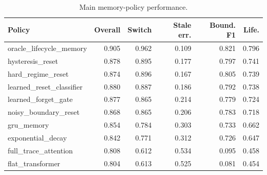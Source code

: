 \begin{table}[t]
\centering
\caption{Main memory-policy performance.}
\label{tab:main-performance}
\small
\begin{tabular}{lrrrrr}
\toprule
Policy & Overall & Switch & Stale err. & Bound. F1 & Life. \\
\midrule
oracle\_lifecycle\_memory & 0.905 & 0.962 & 0.109 & 0.821 & 0.796 \\
hysteresis\_reset & 0.878 & 0.895 & 0.177 & 0.797 & 0.741 \\
hard\_regime\_reset & 0.874 & 0.896 & 0.167 & 0.805 & 0.739 \\
learned\_reset\_classifier & 0.880 & 0.887 & 0.186 & 0.792 & 0.738 \\
learned\_forget\_gate & 0.877 & 0.865 & 0.214 & 0.779 & 0.724 \\
noisy\_boundary\_reset & 0.868 & 0.865 & 0.206 & 0.783 & 0.718 \\
gru\_memory & 0.854 & 0.784 & 0.303 & 0.733 & 0.662 \\
exponential\_decay & 0.842 & 0.771 & 0.312 & 0.726 & 0.647 \\
full\_trace\_attention & 0.808 & 0.612 & 0.534 & 0.095 & 0.458 \\
flat\_transformer & 0.804 & 0.613 & 0.525 & 0.081 & 0.454 \\
\bottomrule
\end{tabular}
\end{table}
